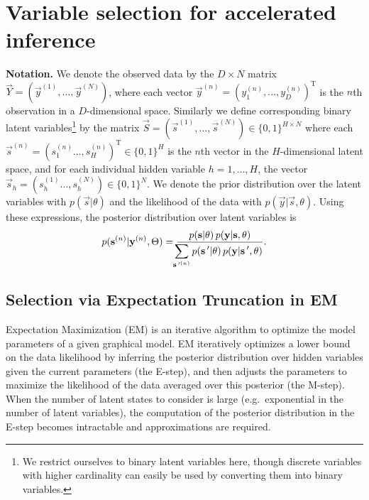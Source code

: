 \section{Variable selection for accelerated inference}
\label{method}
%
\textbf{Notation.}
We denote the observed data by the $D\times N$ matrix $\vec{Y}=(\vec{y}^{(1)}, \dots, \vec{y}^{(N)})$, where each vector $\vec{y}^{(n)} = ( y_1^{(n)}, \dots, y_D^{(n)})^\mathrm{T}$ is the $n$th observation 
in a $D$-dimensional space.
Similarly we define corresponding 
binary latent variables\footnote{We restrict ourselves to binary latent variables here, though
discrete variables with higher cardinality can easily be used by
converting them into binary variables.} 
by the matrix $\vec{S} = (\vec{s}^{(1)}, \dots, \vec{s}^{(N)})\in \{0,1\}^{H \times N}$ 
where each $\vec{s}^{(n)}=(s_1^{(n)}\dots, s^{(n)}_H)^\mathrm{T} \in \{0,1\}^{H}$ is the $n$th vector in the $H$-dimensional latent space,
and for each individual hidden variable $h=1,\dots,H$, the vector $\vec{s}_h=(s_h^{(1)}\dots, s^{(N)}_h)\in \{0,1\}^{N}$. 
%
We denote the prior distribution over the latent variables with $p(\vec{s} | \theta)$ 
and the likelihood of the data with $p(\vec{y} | \vec{s}, \theta)$.
Using these expressions, the posterior distribution over latent variables is 
%
\vspace{-.1cm}
\begin{equation}
\label{eq:post}
p({\mathbf{s}}^{(n)}|{\mathbf{y}}^{(n)},\Theta)  = \frac{p({\mathbf{s}} | \theta) \, p({\mathbf{y}} | {\mathbf{s}}, \theta)}
{\displaystyle\hspace{-1.5mm}\sum_{{\mathbf{s}}\,'^{(n)}} p({\mathbf{s}}\,' | \theta) \, p({\mathbf{y}} | {\mathbf{s}}\,', \theta)}.
\end{equation}
\vspace{-.5cm}

\subsection{Selection via Expectation Truncation in EM}
Expectation Maximization (EM) is an iterative algorithm to optimize the model parameters of a given graphical model.
EM iteratively optimizes a lower bound on the data likelihood by inferring the
posterior distribution over hidden variables given the current parameters (the
E-step), and then adjusts the parameters to maximize the likelihood of the
data averaged over this posterior (the M-step).
%
When the number of latent states to consider is large (e.g.\ exponential in the
number of latent variables), the computation of the posterior distribution in
the E-step becomes intractable and approximations are required.

